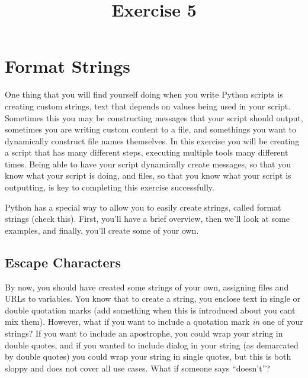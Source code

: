 \documentclass{article}
\begin{document}

\title{Exercise 5}
\maketitle

\section{Format Strings}
One thing that you will find yourself doing when you write Python scripts is creating custom strings, text that depends on values being used in your script.  Sometimes this you may be constructing messages that your script should output, sometimes you are writing custom content to a file, and somethings you want to dynamically construct file names themselves.  In this exercise you will be creating a script that has many different steps, executing multiple tools many different times.  Being able to have your script dynamically create messages, so that you know what your script is doing, and files, so that you know what your script is outputting, is key to completing this exercise successfully.

Python has a special way to allow you to easily create strings, called format strings (check this).  First, you'll have a brief overview, then we'll look at some examples, and finally, you'll create some of your own.  

\subsection{Escape Characters}
By now, you should have created some strings of your own, assigning files and URLs to variables.  You know that to create a string, you enclose text in single or double quotation marks (add something when this is introduced about you cant mix them).  However, what if you want to include a quotation mark \textit{in} one of your strings?  If you want to include an apostrophe, you could wrap your string in double quotes, and if you wanted to include dialog in your string (as demarcated by double quotes) you could wrap your string in single quotes, but this is both sloppy and does not cover all use cases.  What if someone says ``doesn't''?
\end{document}
